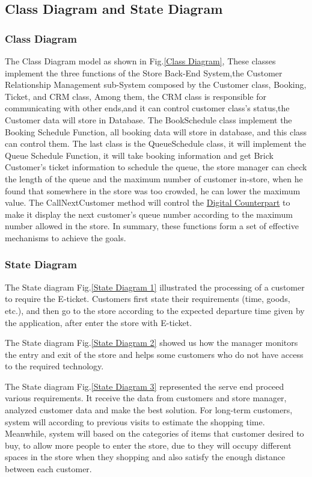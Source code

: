 \documentclass[a4paper,12pt]{report}
\begin{document}
\subsection{Class Diagram and State Diagram}
\subsubsection{Class Diagram}
The Class Diagram model as shown in Fig.\ref{Class Diagram}, These classes implement the three functions of the Store Back-End System,the Customer Relationship Management sub-System composed by the  Customer class, Booking, Ticket, and CRM class, Among them, the CRM class is responsible for communicating with other ends,and it can control customer class's status,the Customer data will store in Database. The BookSchedule class implement the Booking Schedule Function, all booking data will store in database, and this class can control them. The last class is the QueueSchedule class, it will implement the Queue Schedule Function, it will take booking information and get Brick Customer's ticket information to schedule the queue, the store manager can check the length of the queue and the maximum number of customer in-store, when he found that somewhere in the store was too crowded, he can lower the maximum value. The CallNextCustomer method will control the \hyperref[Definitions]{Digital Counterpart} to make it display the next customer's queue number according to the maximum number allowed in the store. In summary, these functions form a set of effective mechanisms to achieve the goals.



\subsubsection{State Diagram}
The State diagram Fig.\ref{State Diagram 1} illustrated the processing of a customer to require the E-ticket. Customers first state their requirements (time, goods, etc.), and then go to the store according to the expected departure time given by the application, after enter the store with E-ticket.

The State diagram Fig.\ref{State Diagram 2} showed us how the manager monitors the entry and exit of the store and helps some customers who do not have access to the required technology.

The State diagram Fig.\ref{State Diagram 3} represented the serve end proceed various requirements. It receive the data from customers and store manager, analyzed customer data and make the best solution. For long-term customers, system will according to previous visits to estimate the shopping time. Meanwhile, system will based on the categories of items that customer desired to buy, to allow more people to enter the store, due to they will occupy different spaces in the store when they shopping and also satisfy the enough distance between each customer.
\end{document}
